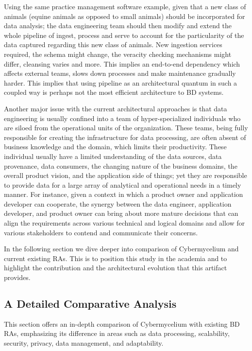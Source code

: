 \documentclass[review]{elsarticle}
\begin{document}
Using the same practice management software example, given that a new class of animals (equine animals as opposed to small animals) should be incorporated for data analysis; the data engineering team should then modify and extend the whole pipeline of ingest, process and serve to account for the particularity of the data captured regarding this new class of animals. New ingestion services required, the schema might change, the veracity checking mechanisms might differ, cleansing varies and more. This implies an end-to-end dependency which affects external teams, slows down processes and make maintenance gradually harder. This implies that using pipeline as an architectural quantum in such a coupled way is perhaps not the most efficient architecture to BD systems.

Another major issue with the current architectural approaches is that data engineering is usually confined into a team of hyper-specialized individuals who are siloed from the operational units of the organization. These teams, being fully responsible for creating the infrastructure for data processing, are often absent of business knowledge and the domain, which limits their productivity. These individual usually have a limited understanding of the data sources, data provenance, data consumers, the changing nature of the business domains, the overall product vision, and the application side of things; yet they are responsible to provide data for a large array of analytical and operational needs in a timely manner. For instance, given a context in which a product owner and application developer can cooperate, the synergy between the data engineer, application developer, and product owner can bring about more mature decisions that can align the requirements across various technical and logical domains and allow for various stakeholders to contend and communicate their concerns.

In the following section we dive deeper into comparison of Cybermycelium and current existing RAs. This is to position this study in the academia and to highlight the contribution and the architectural evolution that this artifact provides. 

\subsection{A Detailed Comparative Analysis}
This section offers an in-depth comparison of Cybermycelium with existing BD RAs, emphasizing its difference in areas such as data processing, scalability, security, privacy, data management, and adaptability.
\end{document}
